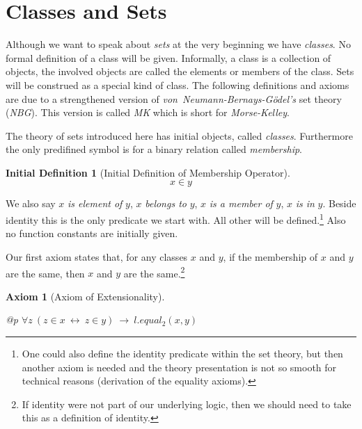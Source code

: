 \documentclass[a4paper,german,10pt,twoside]{book}
\newtheorem{ax}{Axiom}
\theoremstyle{definition}
\newtheorem{idefn}[thm]{Initial Definition}
\theoremstyle{remark}
\begin{document}
\section{Classes and Sets} \label{chapter0_section0} \hypertarget{chapter0_section0}{}
Although we want to speak about \emph{sets} at the very beginning we have \emph{classes}. No formal definition of a class will be given. Informally, a class is a collection of objects, the involved objects are called the elements or members of the class. 
Sets will be construed as a special kind of class. 
The following definitions and axioms are due to a strengthened version of \emph{von~Neumann-Bernays-G{\"o}del's} set theory (\emph{NBG}). This version is called \emph{MK} which is short for \emph{Morse-Kelley}.

\par
The theory of sets introduced here has initial objects, called \emph{classes}. Furthermore the only predifined symbol is for a binary relation called \emph{membership}.

\begin{idefn}[Initial Definition of Membership Operator]
\label{in} \hypertarget{in}{}
$$x \in y$$

\end{idefn}

We also say $x$ \emph{is element of} $y$, $x$ \emph{belongs to} $y$, $x$ \emph{is a member of} $y$, $x$ \emph{is in} $y$.
Beside identity this is the only predicate we start with. All other will be defined.\footnote{One could also define the identity predicate within the set theory, but then another axiom is needed and the theory presentation is not so smooth for technical reasons (derivation of the equality axioms).} Also no function constants are initially given.


\par
Our first axiom states that, for any classes $x$ and $y$, if the membership of $x$ and $y$ are the same, then $x$ and $y$ are the same.\footnote{If identity were not part of our underlying logic, then we should need to take this as a definition of identity.}

\begin{ax}[Axiom of Extensionality]
\label{axiom:extensionality} \hypertarget{axiom:extensionality}{}
\mbox{}
\begin{longtable}{{@{\extracolsep{\fill}}p{\linewidth}}}
\centering $\forall z\ (z \in x\ \leftrightarrow \ z \in y)\ \rightarrow \ l.equal_2(x, y)$
\end{longtable}

\end{ax}
\end{document}

